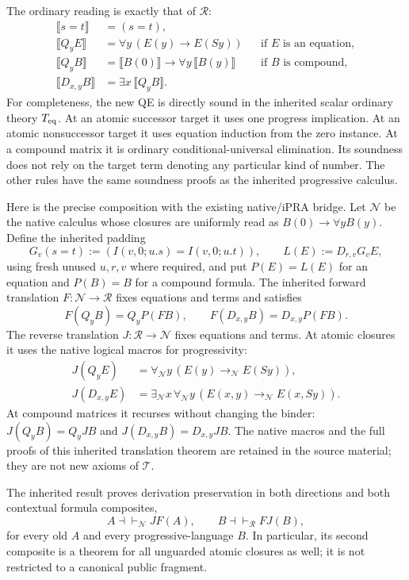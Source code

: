 The ordinary reading is exactly that of $\mathcal R$:
\[
 \begin{aligned}
 \llbracket s=t\rrbracket&=(s=t),\\
 \llbracket Q_yE\rrbracket
   &=\forall y\,(E(y)\to E(Sy))&&\text{if $E$ is an equation},\\
 \llbracket Q_yB\rrbracket
   &=\llbracket B(0)\rrbracket\to\forall y\,\llbracket B(y)\rrbracket
      &&\text{if $B$ is compound},\\
 \llbracket D_{x,y}B\rrbracket&=\exists x\,\llbracket Q_yB\rrbracket.
 \end{aligned}
\]
For completeness, the new QE is directly sound in the inherited scalar
ordinary theory $T_{\rm eq}$.  At an atomic successor target it uses one
progress implication.  At an atomic nonsuccessor target it uses equation
induction from the zero instance.  At a compound matrix it is ordinary
conditional-universal elimination.  Its soundness does not rely on the
target term denoting any particular kind of number.  The other rules have
the same soundness proofs as the inherited progressive calculus.

Here is the precise composition with the existing native/iPRA bridge.
Let $\mathcal N$ be the native calculus whose closures are uniformly read
as $B(0)\to\forall yB(y)$.  Define the inherited padding
\[
 G_v(s=t):=(I(v,0;u.s)=I(v,0;u.t)),\qquad
 L(E):=D_{r,v}G_vE,
\]
using fresh unused $u,r,v$ where required, and put $P(E)=L(E)$ for an
equation and $P(B)=B$ for a compound formula.  The inherited forward
translation $F:\mathcal N\to\mathcal R$ fixes equations and terms and
satisfies
\[
 F(Q_yB)=Q_yP(FB),\qquad F(D_{x,y}B)=D_{x,y}P(FB).
\]
The reverse translation $J:\mathcal R\to\mathcal N$ fixes equations and
terms.  At atomic closures it uses the native logical macros for
progressivity:
\[
 \begin{aligned}
 J(Q_yE)&=\forall_{\mathcal N}y\,
                    (E(y)\to_{\mathcal N}E(Sy)),\\
 J(D_{x,y}E)&=\exists_{\mathcal N}x\,\forall_{\mathcal N}y\,
                    (E(x,y)\to_{\mathcal N}E(x,Sy)).
 \end{aligned}
\]
At compound matrices it recurses without changing the binder:
$J(Q_yB)=Q_yJB$ and $J(D_{x,y}B)=D_{x,y}JB$.
The native macros and the full proofs of this inherited translation theorem
are retained in the source material; they are not new axioms of $\mathcal T$.

The inherited result\cite{uniform} proves derivation preservation in both directions and
both contextual formula composites,
\[
 A\dashv\vdash_{\mathcal N}JF(A),\qquad
 B\dashv\vdash_{\mathcal R}FJ(B),
\]
for every old $A$ and every progressive-language $B$.  In particular, its
second composite is a theorem for all unguarded atomic closures as well;
it is not restricted to a canonical public fragment.

